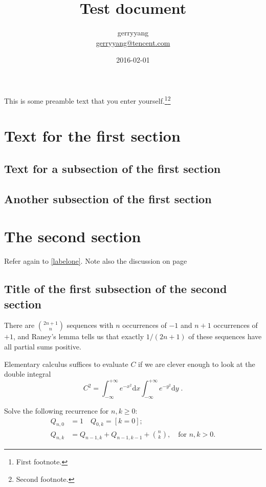 \documentclass{article}
\title{Test document}
\author{gerryyang \\ \url{gerryyang@tencent.com}}
\date{2016-02-01}
\begin{document}
\maketitle
\tableofcontents
\newpage

This is some preamble text that you enter yourself.\footnote{First footnote.}\footnote{Second footnote.}

\section{Text for the first section}
\lipsum[1]

\subsection{Text for a subsection of the first section}
\lipsum[2-3]
\label{labelone}

\subsection{Another subsection of the first section}
\lipsum[4-5]
\label{labeltwo}

\section{The second section}
\lipsum[6]

Refer again to \ref{labelone}.\cite{ConcreteMath}
Note also the discussion on page \pageref{labeltwo}

\subsection{Title of the first subsection of the second section}
\lipsum[7]

There are $\binom{2n+1}{n}$ sequences with $n$ occurrences of 
$-1$ and $n+1$ occurrences of $+1$, and Raney's lemma
tells us that exactly $1/(2n+1)$ of these sequences have all
partial sums positive.

Elementary calculus suffices to evaluate $C$ if we are clever enough
to look at the double integral
\begin{equation*}
  C^2
  =\int_{-\infty}^{+\infty} e^{-x^2} \mathrm{d}x
   \int_{-\infty}^{+\infty} e^{-y^2} \mathrm{d}y\;.
\end{equation*}

Solve the following recurrence for $n,k\geq 0$:
\begin{align*}
  Q_{n,0} &= 1
  \quad Q_{0,k} = [k=0];  \\
  Q_{n,k} &= Q_{n-1,k}+Q_{n-1,k-1}+\binom{n}{k}, \quad\text{for $n,k>0$.}
\end{align*}
\end{document}
